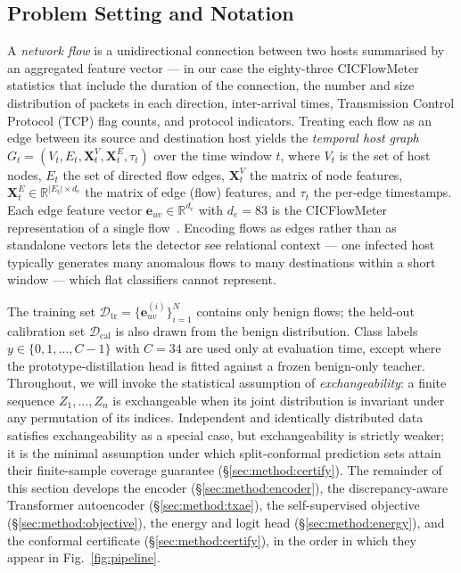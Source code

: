 \documentclass{ieeeaccess}
\begin{document}
\subsection{Problem Setting and Notation}
\label{sec:method:setting}
A \emph{network flow} is a unidirectional connection between two hosts
summarised by an aggregated feature vector --- in our case the
eighty-three CICFlowMeter statistics that include the duration of the
connection, the number and size distribution of packets in each direction,
inter-arrival times, Transmission Control Protocol (TCP) flag counts, and
protocol indicators. Treating
each flow as an edge between its source and destination host yields the
\emph{temporal host graph}
$G_t = (V_t, E_t, \mathbf{X}_t^V, \mathbf{X}_t^E, \tau_t)$ over the time
window $t$, where $V_t$ is the set of host nodes, $E_t$ the set of
directed flow edges, $\mathbf{X}_t^V$ the matrix of node features,
$\mathbf{X}_t^E \in \mathbb{R}^{|E_t|\times d_e}$ the matrix of edge
(flow) features, and $\tau_t$ the per-edge timestamps. Each edge feature
vector $\mathbf{e}_{uv} \in \mathbb{R}^{d_e}$ with $d_e = 83$ is the
CICFlowMeter representation of a single flow~\cite{sharafaldin2018cicids}.
Encoding flows as edges rather than as standalone vectors lets the
detector see relational context --- one infected host typically generates
many anomalous flows to many destinations within a short window --- which
flat classifiers cannot represent.

The training set
$\mathcal{D}_\text{tr} = \{\mathbf{e}_{uv}^{(i)}\}_{i=1}^N$ contains only
benign flows; the held-out calibration set $\mathcal{D}_\text{cal}$ is
also drawn from the benign distribution. Class labels
$y \in \{0, 1, \dots, C-1\}$ with $C = 34$ are used only at evaluation
time, except where the prototype-distillation head is fitted against a
frozen benign-only teacher. Throughout, we will invoke the
statistical assumption of \emph{exchangeability}: a finite sequence
$Z_1, \dots, Z_n$ is exchangeable when its joint distribution is invariant
under any permutation of its indices. Independent and identically
distributed data satisfies exchangeability as a special case, but
exchangeability is strictly weaker; it is the minimal assumption under
which split-conformal prediction sets attain their finite-sample coverage
guarantee (\S\ref{sec:method:certify}). The remainder of this section
develops the encoder (\S\ref{sec:method:encoder}), the discrepancy-aware
Transformer autoencoder (\S\ref{sec:method:txae}), the self-supervised
objective (\S\ref{sec:method:objective}), the energy and logit head
(\S\ref{sec:method:energy}), and the conformal certificate
(\S\ref{sec:method:certify}), in the order in which they appear in
Fig.~\ref{fig:pipeline}.
\end{document}
